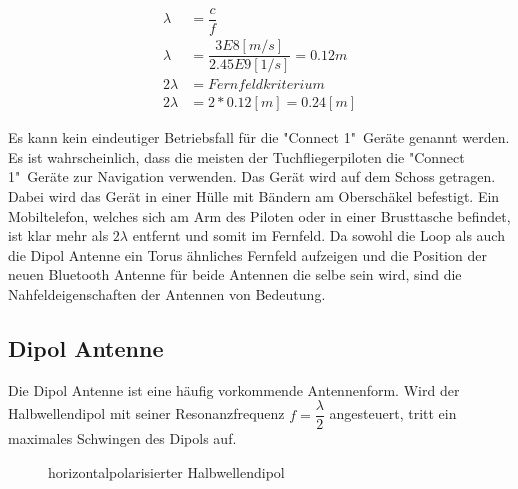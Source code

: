 \begin{align}\label{eq:Fernfeld}
\lambda &=\dfrac{c}{f} \\
\lambda &=\dfrac{3E8[m/s]}{2.45E9[1/s]}=0.12m\\ \nonumber
2\lambda &= Fernfeldkriterium\\ \nonumber
2\lambda &= 2*0.12[m] =0.24[m] \nonumber
\end{align}

Es kann kein eindeutiger Betriebsfall für die "Connect 1"\  Geräte genannt werden. Es ist wahrscheinlich, dass die meisten der Tuchfliegerpiloten die "Connect 1"\  Geräte zur Navigation verwenden. Das Gerät wird auf dem Schoss getragen. Dabei wird das Gerät in einer Hülle mit Bändern am Oberschäkel befestigt. Ein Mobiltelefon, welches sich am Arm des Piloten oder in einer Brusttasche befindet, ist klar mehr als $2\lambda$ entfernt und somit im Fernfeld. Da sowohl die Loop als auch die Dipol Antenne ein Torus ähnliches Fernfeld aufzeigen und die Position der neuen Bluetooth Antenne für beide Antennen die selbe sein wird, sind die Nahfeldeigenschaften der Antennen von Bedeutung.

\subsection{Dipol Antenne}
Die Dipol Antenne ist eine häufig vorkommende Antennenform.  Wird der Halbwellendipol mit seiner Resonanzfrequenz $f=\dfrac{\lambda}{2}$ angesteuert, tritt ein maximales Schwingen des Dipols auf.
\begin{figure}[h]%
	\begin{center}
	\end{center}
\caption{horizontalpolarisierter Halbwellendipol}
\label{fig:HalbWellenDipolHorizontal}
\end{figure}


